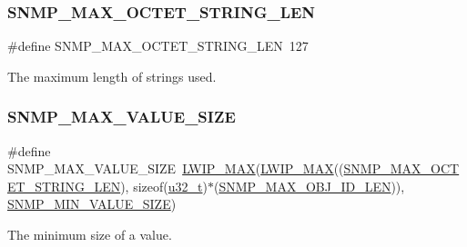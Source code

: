 \subsubsection{\texorpdfstring{S\+N\+M\+P\+\_\+\+M\+A\+X\+\_\+\+O\+C\+T\+E\+T\+\_\+\+S\+T\+R\+I\+N\+G\+\_\+\+L\+EN}{SNMP\_MAX\_OCTET\_STRING\_LEN}\hspace{0.1cm}{\footnotesize\ttfamily [2/2]}}
{\footnotesize\ttfamily \#define S\+N\+M\+P\+\_\+\+M\+A\+X\+\_\+\+O\+C\+T\+E\+T\+\_\+\+S\+T\+R\+I\+N\+G\+\_\+\+L\+EN~127}

The maximum length of strings used. \mbox{\label{group__snmp__opts_gafb4362575bc50476a7401a1ed14787f0}} 
\subsubsection{\texorpdfstring{S\+N\+M\+P\+\_\+\+M\+A\+X\+\_\+\+V\+A\+L\+U\+E\+\_\+\+S\+I\+ZE}{SNMP\_MAX\_VALUE\_SIZE}\hspace{0.1cm}{\footnotesize\ttfamily [1/2]}}
{\footnotesize\ttfamily \#define S\+N\+M\+P\+\_\+\+M\+A\+X\+\_\+\+V\+A\+L\+U\+E\+\_\+\+S\+I\+ZE~\hyperlink{openmote-cc2538_2lwip_2src_2include_2lwip_2def_8h_a21ea174d374106caeafb4aa3a24fbd2b}{L\+W\+I\+P\+\_\+\+M\+AX}(\hyperlink{openmote-cc2538_2lwip_2src_2include_2lwip_2def_8h_a21ea174d374106caeafb4aa3a24fbd2b}{L\+W\+I\+P\+\_\+\+M\+AX}((\hyperlink{group__snmp__opts_gae50cdd09697aa54a8b9f26432ac55ac2}{S\+N\+M\+P\+\_\+\+M\+A\+X\+\_\+\+O\+C\+T\+E\+T\+\_\+\+S\+T\+R\+I\+N\+G\+\_\+\+L\+EN}), sizeof(\hyperlink{group__compiler__abstraction_ga4c14294869aceba3ef9d4c0c302d0f33}{u32\+\_\+t})$\ast$(\hyperlink{group__snmp__opts_ga3ad9d293f90e3c885c4e3263a9064a41}{S\+N\+M\+P\+\_\+\+M\+A\+X\+\_\+\+O\+B\+J\+\_\+\+I\+D\+\_\+\+L\+EN})), \hyperlink{group__snmp__opts_gac815d0dbe576299546ac612e7eaf3f90}{S\+N\+M\+P\+\_\+\+M\+I\+N\+\_\+\+V\+A\+L\+U\+E\+\_\+\+S\+I\+ZE})}

The minimum size of a value. \mbox{\label{group__snmp__opts_gafb4362575bc50476a7401a1ed14787f0}} 
